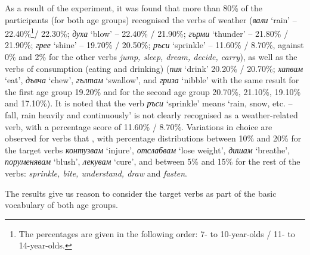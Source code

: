 \documentclass[output=paper,colorlinks,citecolor=brown]{langscibook}
\begin{document}
As a result of the experiment, it was found that more than 80\% of the participants (for both age groups) recognised the verbs of weather (\textit{вали} `rain' -- 22.40\%\footnote{The percentages are given in the following order: 7- to 10-year-olds / 11- to 14-year-olds.}/ 22.30\%; \textit{духа} `blow' -- 22.40\% / 21.90\%; \textit{гърми} `thunder' -- 21.80\% / 21.90\%; \textit{грее} `shine' -- 19.70\% / 20.50\%; \textit{ръси} `sprinkle' -- 11.60\% / 8.70\%, against 0\% and 2\% for the other verbs \textit{jump, sleep, dream, decide, carry}), as well as the verbs of consumption (eating and drinking) (\textit{пия} `drink' 20.20\% / 20.70\%; \textit{хапвам} `eat', \textit{дъвча} `chew', \textit{гълтам} `swallow', and \textit{гриза} `nibble' with the same result for the first age group 19.20\% and for the second age group 20.70\%, 21.10\%, 19.10\% and 17.10\%). It is noted that the verb \textit{ръси} `sprinkle' means `rain, snow, etc. -- fall, rain heavily and continuously' is not clearly recognised as a weather-related verb, with a percentage score of 11.60\% / 8.70\%. Variations in choice are observed for verbs that , with percentage distributions between 10\% and 20\% for the target verbs \textit{контузвам} `injure', \textit{отслабвам} `lose weight', \textit{дишам} `breathe', \textit{поруменявам} `blush', \textit{лекувам} `cure', and between 5\% and 15\% for the rest of the verbs: \textit{sprinkle, bite, understand, draw} and \textit{fasten}. 

The results give us reason to consider the target verbs as part of the basic vocabulary of both age groups. 

\end{document}
